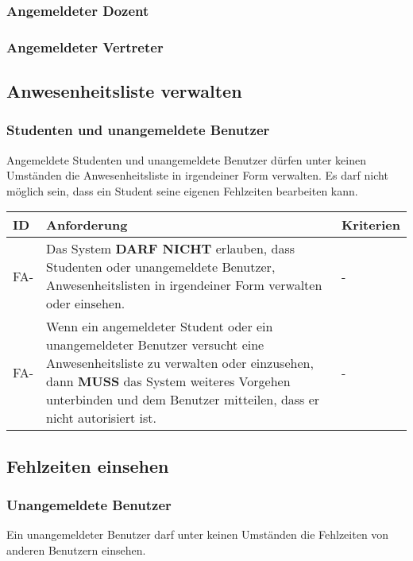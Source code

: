\vspace{12pt}

\subsubsection{Angemeldeter Dozent}

\subsubsection{Angemeldeter Vertreter}

\newpage

\subsection{Anwesenheitsliste verwalten}

\subsubsection{Studenten und unangemeldete Benutzer}
Angemeldete Studenten und unangemeldete Benutzer dürfen unter keinen Umständen die Anwesenheitsliste in irgendeiner Form verwalten. Es darf nicht möglich sein, dass ein Student seine eigenen Fehlzeiten bearbeiten kann.

\vspace{12pt}

\begin{tabular} {|p{}|p{11cm}|p{}|}
	\hline
	ID & Anforderung & Kriterien \\
	\hline
	FA-
	& Das System \textbf{DARF NICHT} erlauben, dass Studenten oder unangemeldete Benutzer, Anwesenheitslisten in irgendeiner Form verwalten oder einsehen. 
	& - \\
	\hline
	FA-
	& Wenn ein angemeldeter Student oder ein unangemeldeter Benutzer versucht eine Anwesenheitsliste zu verwalten oder einzusehen, dann \textbf{MUSS} das System weiteres Vorgehen unterbinden und dem Benutzer mitteilen, dass er nicht autorisiert ist.
	& - \\ 
	\hline
\end{tabular}

\newpage

\subsection{Fehlzeiten einsehen}

\subsubsection{Unangemeldete Benutzer}
Ein unangemeldeter Benutzer darf unter keinen Umständen die Fehlzeiten von anderen Benutzern einsehen.

